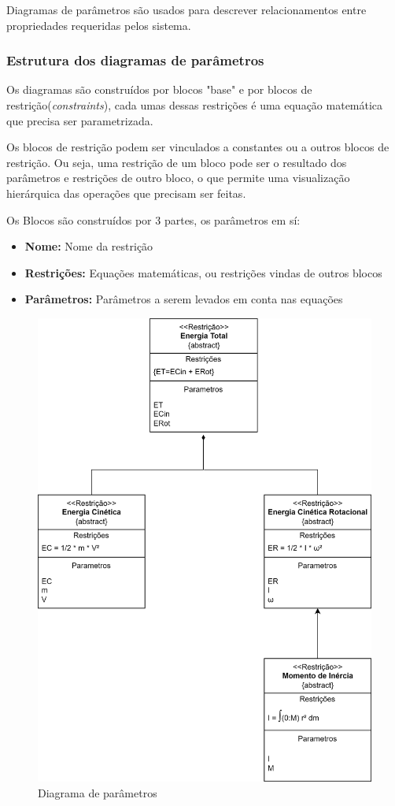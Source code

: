 Diagramas de parâmetros são usados para descrever relacionamentos entre propriedades requeridas pelos sistema.

\subsubsection{Estrutura dos diagramas de parâmetros}

Os diagramas são construídos por blocos "base" e por blocos de restrição(\textit{constraints}), cada umas dessas restrições é uma equação matemática que precisa ser parametrizada.

Os blocos de restrição podem ser vinculados a constantes ou a outros blocos de restrição. Ou seja, uma restrição de um bloco pode ser o resultado dos parâmetros e restrições de outro bloco, o que permite uma visualização hierárquica das operações que precisam ser feitas.

Os Blocos são construídos por 3 partes, os parâmetros em sí:

\begin{itemize}
  \item \textbf{Nome:} Nome da restrição
  \item \textbf{Restrições:} Equações matemáticas, ou restrições vindas de outros blocos
  \item \textbf{Parâmetros:} Parâmetros a serem levados em conta nas equações 
\end{itemize}



\begin{figure}[h]
\centering
\includegraphics[width=\textwidth/2,height=\textheight,keepaspectratio]{figures/diagrama de parametros.png}
\caption{Diagrama de parâmetros}
\label{fig:parameter_diagram}
\end{figure}